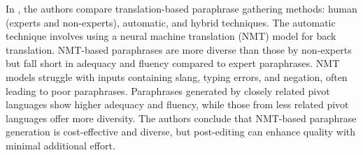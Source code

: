 \documentclass[fleqn,moreauthors,10pt]{ds_report}
\begin{document}

In \cite{federmann-etal-2019-multilingual}, the authors compare translation-based paraphrase gathering methods: human (experts and non-experts), automatic, and hybrid techniques. The automatic technique involves using a neural machine translation (NMT) model for back translation. NMT-based paraphrases are more diverse than those by non-experts but fall short in adequacy and fluency compared to expert paraphrases. NMT models struggle with inputs containing slang, typing errors, and negation, often leading to poor paraphrases. Paraphrases generated by closely related pivot languages show higher adequacy and fluency, while those from less related pivot languages offer more diversity. The authors conclude that NMT-based paraphrase generation is cost-effective and diverse, but post-editing can enhance quality with minimal additional effort.
\end{document}
